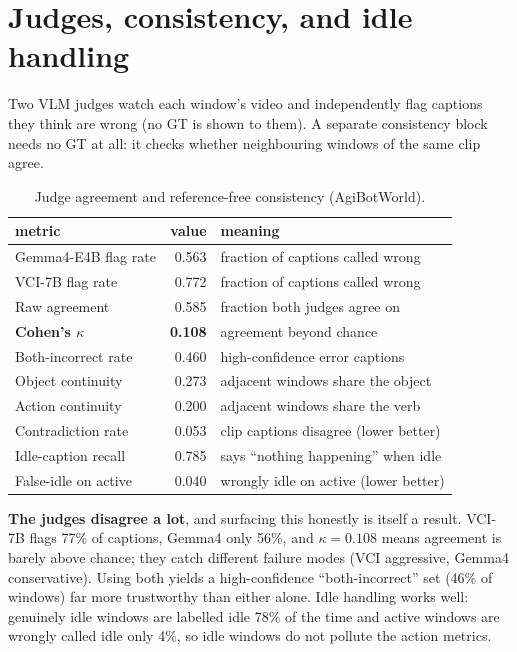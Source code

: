 \documentclass[10pt,letterpaper]{article}
\begin{document}
\section{Judges, consistency, and idle handling}

Two VLM judges watch each window's video and independently flag captions they think are wrong
(no GT is shown to them). A separate consistency block needs no GT at all: it checks whether
neighbouring windows of the same clip agree.

\begin{table}[H]
\centering
\caption{Judge agreement and reference-free consistency (AgiBotWorld).}
\begin{tabular}{lr l}
\toprule
metric & value & meaning \\
\midrule
Gemma4-E4B flag rate    & 0.563 & fraction of captions called wrong \\
VCI-7B flag rate        & 0.772 & fraction of captions called wrong \\
Raw agreement           & 0.585 & fraction both judges agree on \\
\textbf{Cohen's $\kappa$} & \textbf{0.108} & agreement beyond chance \\
Both-incorrect rate     & 0.460 & high-confidence error captions \\
\midrule
Object continuity       & 0.273 & adjacent windows share the object \\
Action continuity       & 0.200 & adjacent windows share the verb \\
Contradiction rate      & 0.053 & clip captions disagree (lower better) \\
Idle-caption recall     & 0.785 & says ``nothing happening'' when idle \\
False-idle on active    & 0.040 & wrongly idle on active (lower better) \\
\bottomrule
\end{tabular}
\end{table}

\textbf{The judges disagree a lot}, and surfacing this honestly is itself a result. VCI-7B flags
77\% of captions, Gemma4 only 56\%, and $\kappa = 0.108$ means agreement is barely above chance;
they catch different failure modes (VCI aggressive, Gemma4 conservative). Using both yields a
high-confidence ``both-incorrect'' set (46\% of windows) far more trustworthy than either alone.
Idle handling works well: genuinely idle windows are labelled idle 78\% of the time and active
windows are wrongly called idle only 4\%, so idle windows do not pollute the action metrics.
\end{document}
